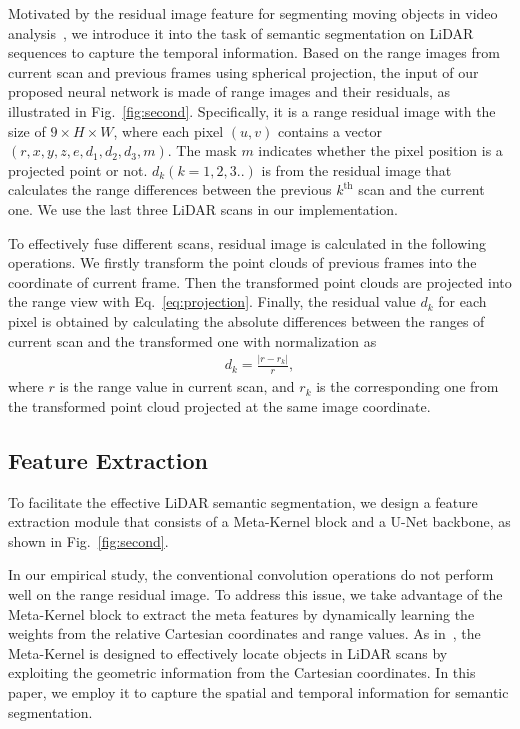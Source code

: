 \documentclass[letterpaper, 10 pt, journal, twoside]{ieeetran}
\newcommand{\abs}[1]{|#1|}
\begin{document}
Motivated by the residual image feature for segmenting moving objects in video analysis~\cite{wang2018temporal,chen2021moving}, we introduce it into the task of semantic segmentation on LiDAR sequences to capture the temporal information. Based on the range images from current scan and previous frames using spherical projection, the input of our proposed neural network is made of range images and their residuals, as illustrated in Fig.~\ref{fig:second}. Specifically, it is a range residual image with the size of $9 \times H \times W$, where each pixel $(u,v)$ contains a vector $(r, x, y, z, e, d_{1}, d_{2}, d_{3}, m)$.  The mask $m$ indicates whether the pixel position is a projected point or not. $d_{k} (k = 1, 2, 3..)$ is from the residual image  that calculates the range differences between the previous $k^\text{th}$ scan and the current one.  We use the last three LiDAR scans in our implementation.


To effectively fuse different scans, residual image is calculated in the following operations. We firstly transform the point clouds of previous frames into the coordinate of current frame. Then the transformed point clouds are projected into the range view with Eq.~\eqref{eq:projection}. Finally, the residual value $d_{k}$ for each pixel is obtained by calculating the absolute differences between the ranges of current scan and the transformed one with normalization as
\begin{align}
	d_{k} =  \frac{\abs{r - r_{k}}}{r},
\end{align}
where $r$ is the range value in current scan, and $r_{k}$ is the corresponding one from the transformed point cloud projected at the same image coordinate. 


\subsection{Feature Extraction}
To facilitate the effective LiDAR semantic segmentation, we design a feature extraction module that consists of a Meta-Kernel block and a U-Net backbone, as shown in Fig.~\ref{fig:second}. 


In our empirical study, the conventional convolution operations do not perform well on the range residual image. To address this issue, we take advantage of the Meta-Kernel block to extract the meta features by dynamically learning the weights from the relative Cartesian coordinates and range values. As in~\cite{fan2021rangedet}, the Meta-Kernel is designed to effectively locate objects in LiDAR scans by exploiting the geometric information from the Cartesian coordinates. In this paper, we employ it to capture the spatial and temporal information for semantic segmentation. 
\end{document}
